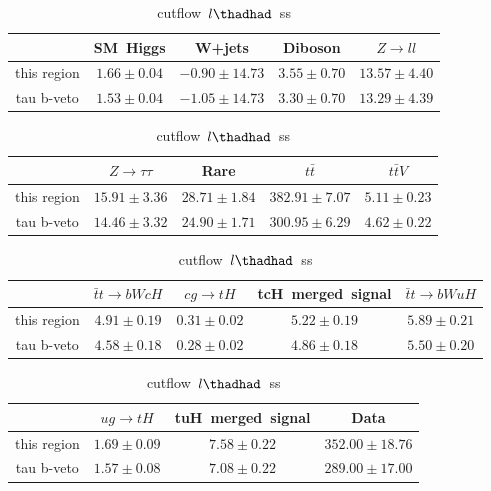 \begin{table}
\footnotesize
\caption{cutflow~$l\thadhad$~ss}
\centering
\begin{tabular}{|c|c|c|c|c|} \hline
 & SM~Higgs & W+jets & Diboson & $Z\to ll$\\\hline
this region & $1.66\pm0.04$ & $-0.90\pm14.73$ & $3.55\pm0.70$ & $13.57\pm4.40$\\\hline
tau b-veto & $1.53\pm0.04$ & $-1.05\pm14.73$ & $3.30\pm0.70$ & $13.29\pm4.39$\\\hline
\end{tabular}
\begin{tabular}{|c|c|c|c|c|} \hline
 & $Z\to \tau\tau$ & Rare & $t\bar{t}$ & $t\bar{t}V$\\\hline
this region & $15.91\pm3.36$ & $28.71\pm1.84$ & $382.91\pm7.07$ & $5.11\pm0.23$\\\hline
tau b-veto & $14.46\pm3.32$ & $24.90\pm1.71$ & $300.95\pm6.29$ & $4.62\pm0.22$\\\hline
\end{tabular}
\begin{tabular}{|c|c|c|c|c|} \hline
 & $\bar{t}t\to bWcH$ & $cg\to tH$ & tcH~merged~signal & $\bar{t}t\to bWuH$\\\hline
this region & $4.91\pm0.19$ & $0.31\pm0.02$ & $5.22\pm0.19$ & $5.89\pm0.21$\\\hline
tau b-veto & $4.58\pm0.18$ & $0.28\pm0.02$ & $4.86\pm0.18$ & $5.50\pm0.20$\\\hline
\end{tabular}
\begin{tabular}{|c|c|c|c|} \hline
 & $ug\to tH$ & tuH~merged~signal & Data\\\hline
this region & $1.69\pm0.09$ & $7.58\pm0.22$ & $352.00\pm18.76$\\\hline
tau b-veto & $1.57\pm0.08$ & $7.08\pm0.22$ & $289.00\pm17.00$\\\hline
\end{tabular}
\label{tab:cutflow_reg1l2tau1bnj_ss}
\end{table}
